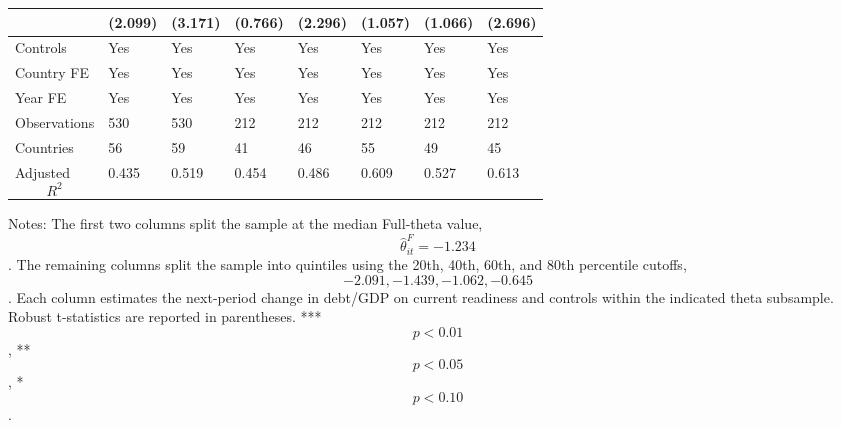\begin{table}[H]
\begin{threeparttable}
\begin{tabularx}{\textwidth}{lYYYYYYY}
  & (2.099) & (3.171) & (0.766) & (2.296) & (1.057) & (1.066) & (2.696) \\
\midrule
Controls & Yes & Yes & Yes & Yes & Yes & Yes & Yes \\
Country FE & Yes & Yes & Yes & Yes & Yes & Yes & Yes \\
Year FE & Yes & Yes & Yes & Yes & Yes & Yes & Yes \\
Observations & 530 & 530 & 212 & 212 & 212 & 212 & 212 \\
Countries & 56 & 59 & 41 & 46 & 55 & 49 & 45 \\
Adjusted $$R^2$$ & 0.435 & 0.519 & 0.454 & 0.486 & 0.609 & 0.527 & 0.613 \\
\bottomrule
\end{tabularx}
\begin{tablenotes}[flushleft]\footnotesize
\item Notes: The first two columns split the sample at the median Full-theta value, $$\widehat{\theta}^{F}_{it}=-1.234$$. The remaining columns split the sample into quintiles using the 20th, 40th, 60th, and 80th percentile cutoffs, $$-2.091, -1.439, -1.062, -0.645$$. Each column estimates the next-period change in debt/GDP on current readiness and controls within the indicated theta subsample. Robust t-statistics are reported in parentheses. *** $$p<0.01$$, ** $$p<0.05$$, * $$p<0.10$$.
\end{tablenotes}
\end{threeparttable}
\end{table}
